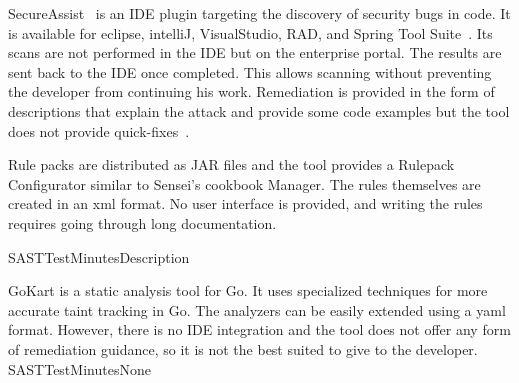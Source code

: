 {
\label{bc:SecureAssist}
SecureAssist~\cite{secureassist} is an IDE plugin targeting the discovery of security bugs in code.
It is available for eclipse, intelliJ, VisualStudio, RAD, and Spring Tool Suite~\cite{sastinide}.
Its scans are not performed in the IDE but on the enterprise portal.
The results are sent back to the IDE once completed.
This allows scanning without preventing the developer from continuing his work. Remediation is provided in the form of descriptions that explain the attack and provide some code examples but the tool does not provide quick-fixes~\cite{secureassistide}. 

Rule packs are distributed as JAR files and the tool provides a Rulepack Configurator similar to Sensei's cookbook Manager.
The rules themselves are created in an \gls{xml} format.
No user interface is provided, and writing the rules requires going through long documentation.
}{SAST}{Test}{Minutes}{Description}

{
\label{bc:gokart}
GoKart is a static analysis tool for Go.
It uses specialized techniques for more accurate taint tracking in Go.
The analyzers can be easily extended using a \gls{yaml} format.
However, there is no IDE integration and the tool does not offer any form of remediation guidance, so it is not the best suited to give to the developer.
}{SAST}{Test}{Minutes}{None}

